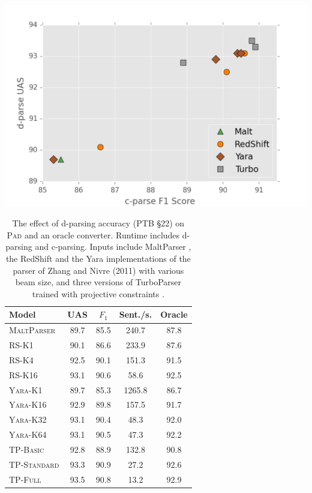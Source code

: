 \documentclass[11pt,letterpaper]{article}
\newcommand{\ParseName}{\textsc{Pad}\xspace}
\begin{document}
\begin{table}[t!]
  \centering
  \small
  \includegraphics[scale=0.45]{../notebooks/camera_ready_plot.png}
  \begin{tabular}[scale=0.7]{lcccc}
    \toprule
    Model & UAS  & $F_1$ & Sent./s.  & Oracle  \\
    \midrule
    \textsc{MaltParser}  & 89.7 & 85.5 & 240.7& 87.8 \\
    \textsc{RS-K1}       & 90.1 & 86.6 & 233.9& 87.6 \\
    \textsc{RS-K4}       & 92.5 & 90.1 & 151.3& 91.5 \\
    \textsc{RS-K16}      & 93.1 & 90.6 & 58.6 & 92.5 \\
    \textsc{Yara-K1}     & 89.7 & 85.3 & 1265.8 & 86.7 \\
    \textsc{Yara-K16}     & 92.9 & 89.8 & 157.5 & 91.7 \\
    \textsc{Yara-K32}     & 93.1 & 90.4 & 48.3 & 92.0 \\
    \textsc{Yara-K64}     & 93.1 & 90.5 & 47.3 & 92.2 \\
    \textsc{TP-Basic}    & 92.8 & 88.9 & 132.8& 90.8 \\
    \textsc{TP-Standard} & 93.3 & 90.9 & 27.2 & 92.6 \\
    \textsc{TP-Full}     & 93.5 & 90.8 & 13.2 & 92.9 \\
    \bottomrule
  \end{tabular}
  \caption{The effect of d-parsing accuracy (PTB \S 22)
    on \ParseName{} and an oracle converter.  Runtime includes
    d-parsing and c-parsing.  
    Inputs include 
    MaltParser \cite{nivre2006maltparser}, 
    the RedShift and the Yara
    implementations of the parser of Zhang and Nivre (2011) 
    with various beam size,
    and three versions of TurboParser trained with projective constraints
    \cite{martins2013turning}.
\label{tab:oracle}}
\vspace{-0.5cm}
\end{table}
\end{document}
